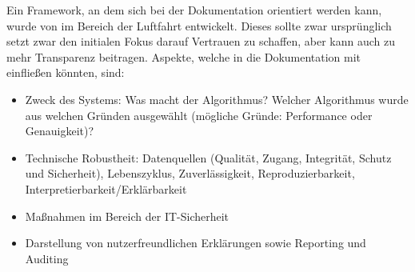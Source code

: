 Ein Framework, an dem sich bei der Dokumentation orientiert werden kann, wurde von \cite{hernandez2021explainable} im Bereich der Luftfahrt entwickelt. Dieses sollte zwar ursprünglich  setzt zwar den initialen Fokus darauf Vertrauen zu schaffen, aber kann auch zu mehr Transparenz beitragen. Aspekte, welche in die Dokumentation mit einfließen könnten, sind:
\begin{itemize}
    \item Zweck des Systems: Was macht der Algorithmus? Welcher Algorithmus wurde aus welchen Gründen ausgewählt (mögliche Gründe: Performance oder Genauigkeit)?
    \item Technische Robustheit: Datenquellen (Qualität, Zugang, Integrität, Schutz und Sicherheit), Lebenszyklus, Zuverlässigkeit, Reproduzierbarkeit, Interpretierbarkeit/Erklärbarkeit
    \item Maßnahmen im Bereich der IT-Sicherheit
    \item Darstellung von nutzerfreundlichen Erklärungen sowie Reporting und Auditing
\end{itemize}

